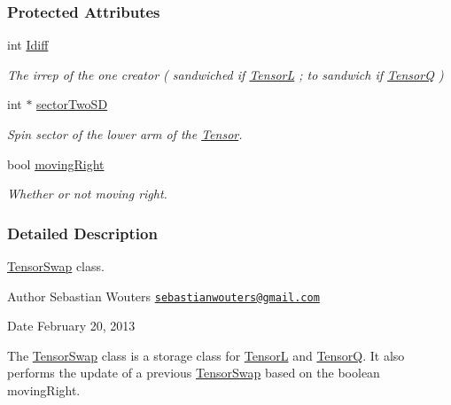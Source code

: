 \subsubsection*{Protected Attributes}
\begin{DoxyCompactItemize}
\item 
\hypertarget{classCheMPS2_1_1TensorSwap_a0b527fe5e9b5a63bd64cecc31b600dc7}{int \hyperlink{classCheMPS2_1_1TensorSwap_a0b527fe5e9b5a63bd64cecc31b600dc7}{Idiff}}\label{classCheMPS2_1_1TensorSwap_a0b527fe5e9b5a63bd64cecc31b600dc7}

\begin{DoxyCompactList}\small\item\em The irrep of the one creator ( sandwiched if \hyperlink{classCheMPS2_1_1TensorL}{Tensor\-L} ; to sandwich if \hyperlink{classCheMPS2_1_1TensorQ}{Tensor\-Q} ) \end{DoxyCompactList}\item 
\hypertarget{classCheMPS2_1_1TensorSwap_a78b4c0262966248775bd234203f5f52d}{int $\ast$ \hyperlink{classCheMPS2_1_1TensorSwap_a78b4c0262966248775bd234203f5f52d}{sector\-Two\-S\-D}}\label{classCheMPS2_1_1TensorSwap_a78b4c0262966248775bd234203f5f52d}

\begin{DoxyCompactList}\small\item\em Spin sector of the lower arm of the \hyperlink{classCheMPS2_1_1Tensor}{Tensor}. \end{DoxyCompactList}\item 
\hypertarget{classCheMPS2_1_1TensorSwap_a855f96278bfe5cb90e2fb7cbd5e1add0}{bool \hyperlink{classCheMPS2_1_1TensorSwap_a855f96278bfe5cb90e2fb7cbd5e1add0}{moving\-Right}}\label{classCheMPS2_1_1TensorSwap_a855f96278bfe5cb90e2fb7cbd5e1add0}

\begin{DoxyCompactList}\small\item\em Whether or not moving right. \end{DoxyCompactList}\end{DoxyCompactItemize}


\subsubsection{Detailed Description}
\hyperlink{classCheMPS2_1_1TensorSwap}{Tensor\-Swap} class. \begin{DoxyAuthor}{Author}
Sebastian Wouters \href{mailto:sebastianwouters@gmail.com}{\tt sebastianwouters@gmail.\-com} 
\end{DoxyAuthor}
\begin{DoxyDate}{Date}
February 20, 2013
\end{DoxyDate}
The \hyperlink{classCheMPS2_1_1TensorSwap}{Tensor\-Swap} class is a storage class for \hyperlink{classCheMPS2_1_1TensorL}{Tensor\-L} and \hyperlink{classCheMPS2_1_1TensorQ}{Tensor\-Q}. It also performs the update of a previous \hyperlink{classCheMPS2_1_1TensorSwap}{Tensor\-Swap} based on the boolean moving\-Right. 


